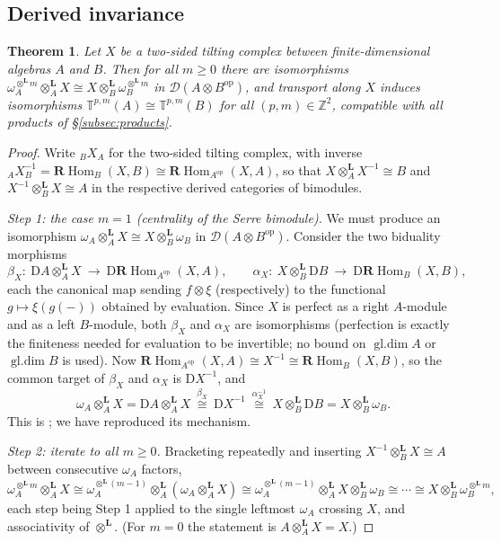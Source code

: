\documentclass[11pt]{amsart}
\newtheorem{theorem}{Theorem}[section]
\theoremstyle{definition}
\newcommand{\T}{\mathbb{T}}
\newcommand{\D}{\mathrm{D}}
\newcommand{\rHom}{\mathbf{R}\!\operatorname{Hom}}
\newcommand{\gl}{\operatorname{gl.dim}}
\newcommand{\der}{\mathcal{D}}
\newcommand{\Lotimes}{\otimes^{\mathbf{L}}}
\begin{document}
\subsection{Derived invariance}

\begin{theorem}\label{thm:derinv}
Let $X$ be a two-sided tilting complex between finite-dimensional algebras
$A$ and $B$. Then for all $m\ge0$ there are isomorphisms
$\omega_A^{\Lotimes m}\Lotimes_AX\cong X\Lotimes_B\omega_B^{\Lotimes m}$
in $\der(A\otimes B^{\mathrm{op}})$, and transport along $X$ induces
isomorphisms $\T^{p,m}(A)\cong\T^{p,m}(B)$ for all $(p,m)\in\mathbb Z^2$,
compatible with all products of \S\ref{subsec:products}.
\end{theorem}

\begin{proof}
Write ${}_BX_A$ for the two-sided tilting complex, with inverse
${}_AX^{-1}_B=\rHom_B(X,B)\cong\rHom_{A^{\mathrm{op}}}(X,A)$, so that
$X\Lotimes_AX^{-1}\cong B$ and $X^{-1}\Lotimes_BX\cong A$ in the respective
derived categories of bimodules.

\emph{Step 1: the case $m=1$ (centrality of the Serre bimodule).} We must
produce an isomorphism $\omega_A\Lotimes_AX\cong X\Lotimes_B\omega_B$ in
$\der(A\otimes B^{\mathrm{op}})$. Consider the two biduality morphisms
\[
\beta_X\colon\ \D A\Lotimes_A X\ \longrightarrow\ \D\rHom_{A^{\mathrm{op}}}(X,A),
\qquad
\alpha_X\colon\ X\Lotimes_B\D B\ \longrightarrow\ \D\rHom_{B}(X,B),
\]
each the canonical map sending $f\otimes\xi$ (respectively) to the functional
$g\mapsto\xi(g(-))$ obtained by evaluation. Since $X$ is perfect as a right
$A$-module and as a left $B$-module, both $\beta_X$ and $\alpha_X$ are
isomorphisms (perfection is exactly the finiteness needed for evaluation to be
invertible; no bound on $\gl A$ or $\gl B$ is used). Now
$\rHom_{A^{\mathrm{op}}}(X,A)\cong X^{-1}\cong\rHom_B(X,B)$, so the common
target of $\beta_X$ and $\alpha_X$ is $\D X^{-1}$, and
\[
\omega_A\Lotimes_AX
=\D A\Lotimes_AX
\ \overset{\beta_X}{\cong}\ \D X^{-1}
\ \overset{\alpha_X^{-1}}{\cong}\ X\Lotimes_B\D B
=X\Lotimes_B\omega_B .
\]
This is \cite[Lemma 3.4]{ArmCox}; we have reproduced its mechanism.

\emph{Step 2: iterate to all $m\ge0$.} Bracketing repeatedly and inserting
$X^{-1}\Lotimes_BX\cong A$ between consecutive $\omega_A$ factors,
\[
\omega_A^{\Lotimes m}\Lotimes_AX
\cong\omega_A^{\Lotimes(m-1)}\Lotimes_A(\omega_A\Lotimes_AX)
\cong\omega_A^{\Lotimes(m-1)}\Lotimes_AX\Lotimes_B\omega_B
\cong\cdots\cong X\Lotimes_B\omega_B^{\Lotimes m},
\]
each step being Step 1 applied to the single leftmost $\omega_A$ crossing $X$,
and associativity of $\Lotimes$. (For $m=0$ the statement is $A\Lotimes_AX=X$.)


\end{proof}
\end{document}
